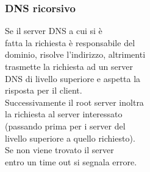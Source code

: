 \documentclass[aspectratio=169]{beamer}
\begin{document}
    \begin{frame}
        \frametitle{DNS ricorsivo}
        Se il server DNS a cui si è\\ fatta la richiesta è responsabile del\\ dominio, risolve l'indirizzo, altrimenti\\ trasmette la richiesta ad un server\\ DNS di livello superiore e aspetta la\\ risposta per il client.\\ Successivamente il root server inoltra\\ la richiesta al server interessato\\ (passando prima per i server del\\ livello superiore a quello richiesto).\\ Se non viene trovato il server\\ entro un time out si segnala errore.
    \end{frame}
    
\end{document}
